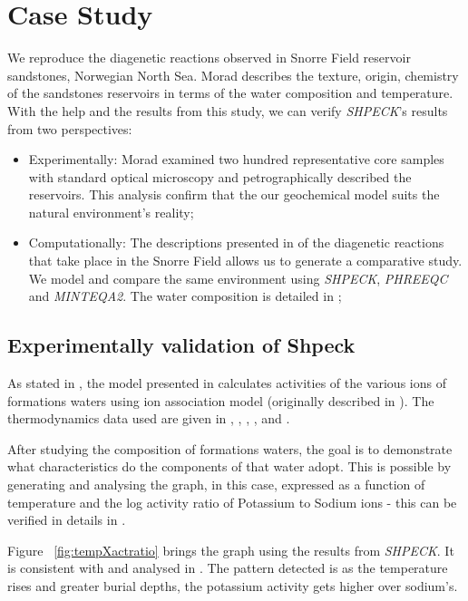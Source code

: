 \section{Case Study}
We reproduce the diagenetic reactions observed in Snorre Field reservoir sandstones, Norwegian North Sea. Morad \cite{Morad:90} describes the texture, origin, chemistry of the sandstones reservoirs in terms of the water composition and temperature. With the help and the results from this study, we  can verify \emph{SHPECK}'s results from two perspectives:
\begin{itemize}
    \item Experimentally: Morad examined two hundred representative core samples with standard optical microscopy and petrographically described the reservoirs. This analysis confirm that the our geochemical model suits the natural environment's reality;
    \item Computationally: The descriptions presented in \cite{Morad:90} of the diagenetic reactions that take place in the Snorre Field allows us to generate a comparative study. We model and compare the same environment using \emph{SHPECK}, \emph{PHREEQC} and \emph{MINTEQA2}. The water composition is detailed in \cite{Nordstrom:79};
\end{itemize}

\subsection{Experimentally validation of Shpeck}
As stated in \cite{Morad:90}, the model presented in \cite{Egeberg:88} calculates activities of the various ions of formations waters using ion association model (originally described in \cite{Wigley:77}). 
The thermodynamics data used are given in \cite{Helgeson:74a},  \cite{Helgeson:74b}, \cite{Helgeson:76}, \cite{Waltter:77}, \cite{Helgeson:78} and \cite{Helgeson:81}.

After studying the composition of formations waters, the goal is to demonstrate what characteristics do the components of that water adopt. 
This is possible by generating and analysing the graph, in this case, expressed as a function of temperature and the log activity ratio of Potassium to Sodium ions - this can be verified in details in \cite{Aagaard:90}. 

Figure ~\ref{fig:tempXactratio} brings the graph using the results from \emph{SHPECK}. 
It is consistent with \cite{Aagaard:90} and analysed in \cite{Morad:90}. The pattern detected is as the temperature rises and greater burial depths, the potassium activity gets higher over sodium's.

